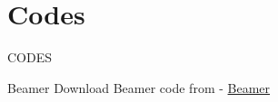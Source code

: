 \documentclass{beamer}
\begin{document}
\section{Codes}
\begin{frame}{CODES}

 \begin{block}{Beamer}
         Download Beamer code from - \href{https://github.com/jarpula-Bhanu/Assignment-12/blob/main/Assignment_12.tex}{Beamer}
    \end{block}
\end{frame} 
\end{document}
